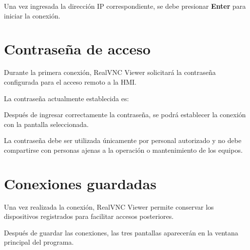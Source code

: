 \documentclass[11pt,a4paper]{article}
\begin{document}
\vspace{0.02cm}

Una vez ingresada la dirección IP correspondiente, se debe presionar
\textbf{Enter} para iniciar la conexión.



\section{Contraseña de acceso}

Durante la primera conexión, RealVNC Viewer solicitará la contraseña
configurada para el acceso remoto a la HMI.

La contraseña actualmente establecida es:

\vspace{-0.08cm}

\begin{center}


\end{center}

\vspace{-0.08cm}

Después de ingresar correctamente la contraseña, se podrá establecer la
conexión con la pantalla seleccionada.

La contraseña debe ser utilizada únicamente por personal autorizado y no
debe compartirse con personas ajenas a la operación o mantenimiento de
los equipos.


\Needspace{0.66\textheight}

\section{Conexiones guardadas}

Una vez realizada la conexión, RealVNC Viewer permite conservar los
dispositivos registrados para facilitar accesos posteriores.

Después de guardar las conexiones, las tres pantallas aparecerán en la
ventana principal del programa.
\end{document}
